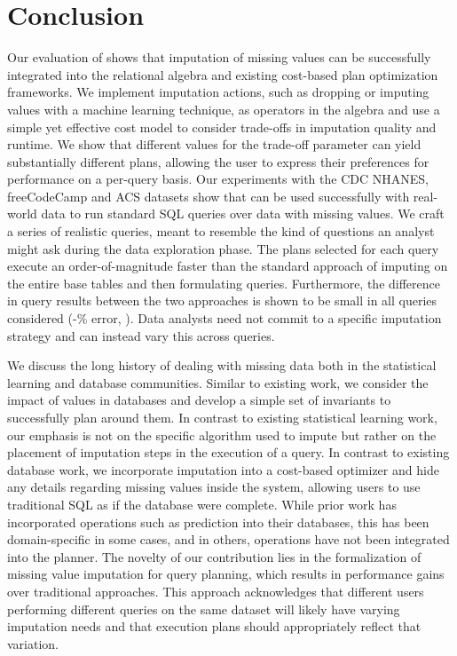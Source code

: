 \section{Conclusion}
Our evaluation of \ProjectName{} shows that imputation of missing values can be successfully integrated into the relational algebra and
existing cost-based plan optimization frameworks. We implement imputation actions, such as dropping or imputing values with a machine
learning technique, as operators in the algebra and use a simple yet effective cost model to consider trade-offs in 
imputation quality and runtime. We show that different values for the trade-off parameter can yield substantially
different plans, allowing the user to express their preferences for performance on a per-query basis.
Our experiments with the CDC NHANES, freeCodeCamp and ACS datasets
show that \ProjectName{} can be used successfully with real-world data to run standard SQL queries over data with missing values. 
We craft a series of realistic queries, meant to resemble the kind of questions an analyst might ask during
the data exploration phase. The plans selected for each query execute an order-of-magnitude faster than
 the standard approach of imputing on the entire base tables and
then formulating queries. Furthermore, the difference in query results between the two approaches is
shown to be small in all queries considered (\lowsmapealphazero{}-\highsmapealphaone{}\% error, ). Data analysts need not commit to a specific imputation strategy and can instead
vary this across queries.

We discuss the long history of dealing with missing data both in the statistical learning and database communities.
Similar to existing work, we consider the impact of \nullv{} values in databases and develop a simple set of invariants to 
successfully plan around them. In contrast to existing statistical learning work, our emphasis is not on the specific algorithm
used to impute but rather on the placement of imputation steps in the execution of a query. In contrast to existing database work,
we incorporate imputation into a cost-based optimizer and hide any details
regarding missing values inside the system, allowing users to use traditional SQL as if the database were complete.
While prior work has incorporated operations such as prediction into their databases, this has been domain-specific
in some cases, and in others, operations have not been integrated into the planner. The novelty
of our contribution lies in the formalization of missing value imputation for query planning, which results in performance
gains over traditional approaches. This approach acknowledges that different users performing different queries on the same
dataset will likely have varying imputation needs and that execution plans should appropriately reflect that variation.

